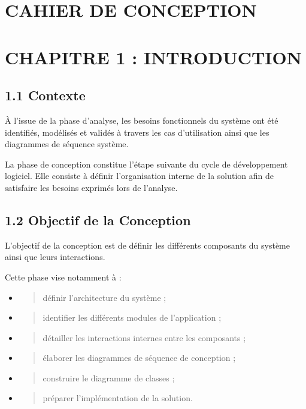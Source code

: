 \documentclass[
]{article}
\author{}
\date{}
\begin{document}
\hypertarget{cahier-de-conception}{%
\section{CAHIER DE CONCEPTION}\label{cahier-de-conception}}

\hypertarget{chapitre-1-introduction}{%
\section{CHAPITRE 1 : INTRODUCTION}\label{chapitre-1-introduction}}

\hypertarget{contexte}{%
\subsection{1.1 Contexte}\label{contexte}}

À l'issue de la phase d'analyse, les besoins fonctionnels du système ont
été identifiés, modélisés et validés à travers les cas d'utilisation
ainsi que les diagrammes de séquence système.

La phase de conception constitue l'étape suivante du cycle de
développement logiciel. Elle consiste à définir l'organisation interne
de la solution afin de satisfaire les besoins exprimés lors de
l'analyse.

\hypertarget{objectif-de-la-conception}{%
\subsection{1.2 Objectif de la
Conception}\label{objectif-de-la-conception}}

L'objectif de la conception est de définir les différents composants du
système ainsi que leurs interactions.

Cette phase vise notamment à :

\begin{itemize}
\item
  \begin{quote}
  définir l'architecture du système ;
  \end{quote}
\item
  \begin{quote}
  identifier les différents modules de l'application ;
  \end{quote}
\item
  \begin{quote}
  détailler les interactions internes entre les composants ;
  \end{quote}
\item
  \begin{quote}
  élaborer les diagrammes de séquence de conception ;
  \end{quote}
\item
  \begin{quote}
  construire le diagramme de classes ;
  \end{quote}
\item
  \begin{quote}
  préparer l'implémentation de la solution.
  \end{quote}
\end{itemize}
\end{document}
